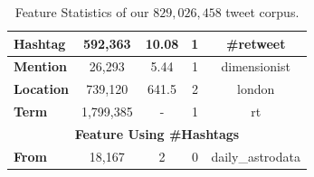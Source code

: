 \begin{table}[t!]
{{\begin{tabular}{|l|c|c|c|c|}
\textbf{Hashtag} & 592,363 & 10.08 & 1 & \#retweet \\ \hline
\textbf{Mention} & 26,293 & 5.44 & 1 & dimensionist \\ \hline
\textbf{Location} & 739,120 & 641.5 & 2 & london \\ \hline
\textbf{Term} & 1,799,385 & - & 1 & rt \\ \hline 
\multicolumn{5}{c}{\textbf{Feature Using \#Hashtags}} \\ \hline
\textbf{From} & 18,167 & 2 & 0 & daily\_astrodata \\ \hline
\end{tabular}
}}
\caption{Feature Statistics of our $829,026,458$ tweet corpus.} %
\label{table:featureStatistics}
\end{table}
